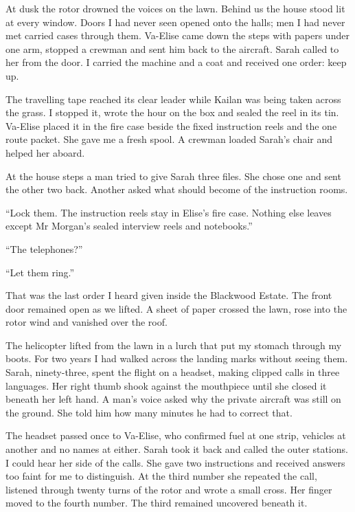 At dusk the rotor drowned the voices on the lawn. Behind us the house stood lit at every window. Doors I had never seen opened onto the halls; men I had never met carried cases through them. Va-Elise came down the steps with papers under one arm, stopped a crewman and sent him back to the aircraft. Sarah called to her from the door. I carried the machine and a coat and received one order: keep up.\par

The travelling tape reached its clear leader while Kailan was being taken across the grass. I stopped it, wrote the hour on the box and sealed the reel in its tin. Va-Elise placed it in the fire case beside the fixed instruction reels and the one route packet. She gave me a fresh spool. A crewman loaded Sarah's chair and helped her aboard.\par

At the house steps a man tried to give Sarah three files. She chose one and sent the other two back. Another asked what should become of the instruction rooms.\par

``Lock them. The instruction reels stay in Elise's fire case. Nothing else leaves except Mr Morgan's sealed interview reels and notebooks.''\par

``The telephones?''\par

``Let them ring.''\par

That was the last order I heard given inside the Blackwood Estate. The front door remained open as we lifted. A sheet of paper crossed the lawn, rose into the rotor wind and vanished over the roof.\par

The helicopter lifted from the lawn in a lurch that put my stomach through my boots. For two years I had walked across the landing marks without seeing them. Sarah, ninety-three, spent the flight on a headset, making clipped calls in three languages. Her right thumb shook against the mouthpiece until she closed it beneath her left hand. A man's voice asked why the private aircraft was still on the ground. She told him how many minutes he had to correct that.\par

The headset passed once to Va-Elise, who confirmed fuel at one strip, vehicles at another and no names at either. Sarah took it back and called the outer stations. I could hear her side of the calls. She gave two instructions and received answers too faint for me to distinguish. At the third number she repeated the call, listened through twenty turns of the rotor and wrote a small cross. Her finger moved to the fourth number. The third remained uncovered beneath it.\par

